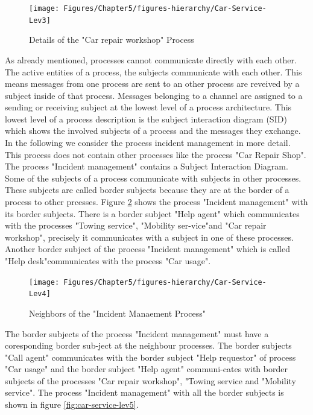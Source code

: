 \begin{figure}[htbp]
	\centering
	\texttt{[image: Figures/Chapter5/figures-hierarchy/Car-Service-Lev3]}
	\caption[Details of the "Car repair workshop" Process]{Details of the "Car repair workshop" Process}
	\label{fig:car-service-lev3}
\end{figure}

As already mentioned, processes cannot communicate directly with each other. The active entities of a process, the subjects communicate with each other. This means messages from one process are sent to an other process are reveived by a subject inside of that process. Messages belonging to a channel are assigned to a sending or receiving subject at the lowest level of a process architecture. This lowest level of a process description is the subject interaction diagram (SID) which shows the involved subjects of a process and the messages they exchange. In the following we consider the process incident management in more detail. This process does not contain other processes like the process "Car Repair Shop". The process "Incident management" contains a Subject Interaction Diagram. Some of the subjects of a process communicate with subjects in other processes. These subjects are called border subjects because they are at the border of a process to other prcesses. Figure \ref{fig:car-service-lev4} shows the process "Incident management" with its border subjects. There is a border subject "Help agent" which communicates with the processes "Towing service", "Mobility ser-vice"and  "Car repair workshop", precisely it communicates with a subject in one of these processes. Another border subject of the process "Incident management" which is called "Help desk"communicates with the process "Car usage".\\

\begin{figure}[htbp]
	\centering
	\texttt{[image: Figures/Chapter5/figures-hierarchy/Car-Service-Lev4]}
	\caption[Neighbors of the "Incident Manaement Process"]{Neighbors of the "Incident Manaement Process"}
	\label{fig:car-service-lev4}
\end{figure}

The border subjects of the process "Incident management" must have a coresponding border sub-ject at the neighbour processes. The border subjects "Call agent" communicates with the border subject "Help requestor" of process "Car usage" and the border subject "Help agent" communi-cates with border subjects of the processes "Car repair workshop", "Towing service and "Mobility service". The process "Incident management" with all the border subjects is shown in  figure \ref{fig:car-service-lev5}.\\

